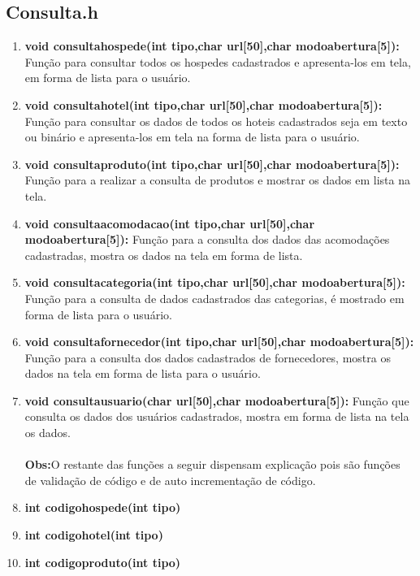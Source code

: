 \documentclass{article}
\begin{document}
\subsection{Consulta.h}
\begin{enumerate}
		\item \textbf{void consultahospede(int tipo,char url[50],char modoabertura[5]): }Função para consultar todos os hospedes cadastrados e apresenta-los em tela, em forma de lista para o usuário.\\
		\item \textbf{void consultahotel(int tipo,char url[50],char modoabertura[5]): }Função para consultar os dados de todos os hoteis cadastrados seja em texto ou binário e apresenta-los em tela na forma de lista para o usuário.\\
		\item \textbf{void consultaproduto(int tipo,char url[50],char modoabertura[5]): }Função para a realizar a consulta de produtos e mostrar os dados em lista na tela.\\
		\item \textbf{void consultaacomodacao(int tipo,char url[50],char modoabertura[5]): }Função para a consulta dos dados das acomodações cadastradas, mostra os dados na tela em forma de lista.\\
		\item \textbf{void consultacategoria(int tipo,char url[50],char modoabertura[5]): }Função para a consulta de dados cadastrados das categorias, é mostrado em forma de lista para o usuário.\\
		\item \textbf{void consultafornecedor(int tipo,char url[50],char modoabertura[5]): }Função para a consulta dos dados cadastrados de fornecedores, mostra os dados na tela em forma de lista para o usuário.\\
		\item \textbf{void consultausuario(char url[50],char modoabertura[5]): }Função que consulta os dados dos usuários cadastrados, mostra em forma de lista na tela os dados.\\\\
		\textbf{Obs:}O restante das funções a seguir dispensam explicação pois são funções de validação de código e de auto incrementação de código.\\
		\item \textbf{int codigohospede(int tipo)}
		\item \textbf{int codigohotel(int tipo)}
		\item \textbf{int codigoproduto(int tipo)}

\end{enumerate}
\end{document}
